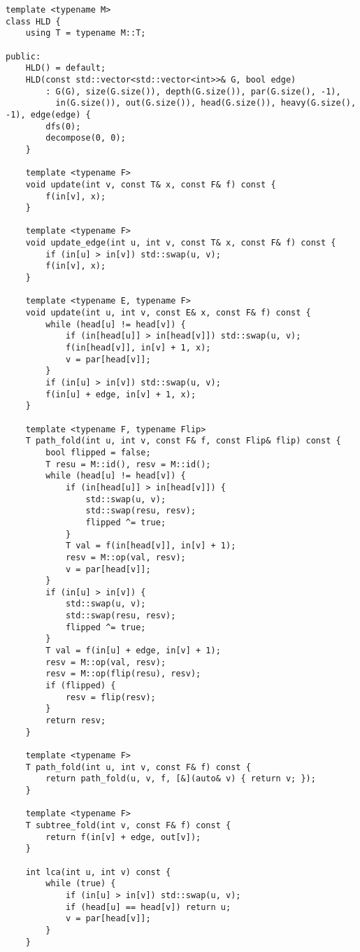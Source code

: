 \begin{lstlisting}
template <typename M>
class HLD {
    using T = typename M::T;

public:
    HLD() = default;
    HLD(const std::vector<std::vector<int>>& G, bool edge)
        : G(G), size(G.size()), depth(G.size()), par(G.size(), -1),
          in(G.size()), out(G.size()), head(G.size()), heavy(G.size(), -1), edge(edge) {
        dfs(0);
        decompose(0, 0);
    }

    template <typename F>
    void update(int v, const T& x, const F& f) const {
        f(in[v], x);
    }

    template <typename F>
    void update_edge(int u, int v, const T& x, const F& f) const {
        if (in[u] > in[v]) std::swap(u, v);
        f(in[v], x);
    }

    template <typename E, typename F>
    void update(int u, int v, const E& x, const F& f) const {
        while (head[u] != head[v]) {
            if (in[head[u]] > in[head[v]]) std::swap(u, v);
            f(in[head[v]], in[v] + 1, x);
            v = par[head[v]];
        }
        if (in[u] > in[v]) std::swap(u, v);
        f(in[u] + edge, in[v] + 1, x);
    }

    template <typename F, typename Flip>
    T path_fold(int u, int v, const F& f, const Flip& flip) const {
        bool flipped = false;
        T resu = M::id(), resv = M::id();
        while (head[u] != head[v]) {
            if (in[head[u]] > in[head[v]]) {
                std::swap(u, v);
                std::swap(resu, resv);
                flipped ^= true;
            }
            T val = f(in[head[v]], in[v] + 1);
            resv = M::op(val, resv);
            v = par[head[v]];
        }
        if (in[u] > in[v]) {
            std::swap(u, v);
            std::swap(resu, resv);
            flipped ^= true;
        }
        T val = f(in[u] + edge, in[v] + 1);
        resv = M::op(val, resv);
        resv = M::op(flip(resu), resv);
        if (flipped) {
            resv = flip(resv);
        }
        return resv;
    }

    template <typename F>
    T path_fold(int u, int v, const F& f) const {
        return path_fold(u, v, f, [&](auto& v) { return v; });
    }

    template <typename F>
    T subtree_fold(int v, const F& f) const {
        return f(in[v] + edge, out[v]);
    }

    int lca(int u, int v) const {
        while (true) {
            if (in[u] > in[v]) std::swap(u, v);
            if (head[u] == head[v]) return u;
            v = par[head[v]];
        }
    }


\end{lstlisting}

